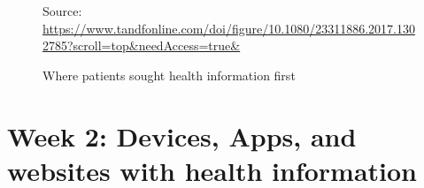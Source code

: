 \documentclass[10pt, twoside]{article}   	%
\begin{document}
\begin{figure}
   \centering
             {\scriptsize%
             Source: \url{https://www.tandfonline.com/doi/figure/10.1080/23311886.2017.1302785?scroll=top&needAccess=true&}}
  \caption{Where patients sought health information first}
  \label{fig:internet_health}
\end{figure}

\section{Week 2: Devices, Apps, and websites with health information }
\end{document}
